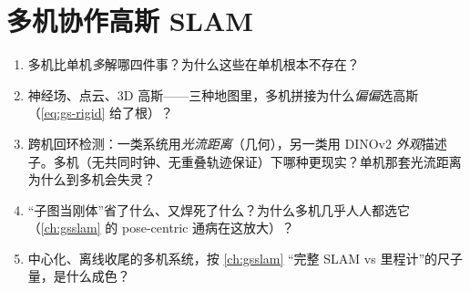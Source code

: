 \chapter{多机协作高斯 SLAM}
\label{ch:magsslam}


\begin{practice}[前置自测]
\begin{enumerate}
  \item 多机比单机\emph{多}解哪四件事？为什么这些在单机根本不存在？
  \item 神经场、点云、3D 高斯——三种地图里，多机拼接为什么\emph{偏偏}选高斯（\cref{eq:gs-rigid} 给了根）？
  \item 跨机回环检测：一类系统用\emph{光流距离}（几何），另一类用 DINOv2 \emph{外观}描述子。多机（无共同时钟、无重叠轨迹保证）下哪种更现实？单机那套光流距离为什么到多机会失灵？
  \item “子图当刚体”省了什么、又焊死了什么？为什么多机几乎人人都选它（\cref{ch:gsslam} 的 pose-centric 通病在这放大）？
  \item 中心化、离线收尾的多机系统，按 \cref{ch:gsslam} “完整 SLAM vs 里程计”的尺子量，是什么成色？
\end{enumerate}
\end{practice}


